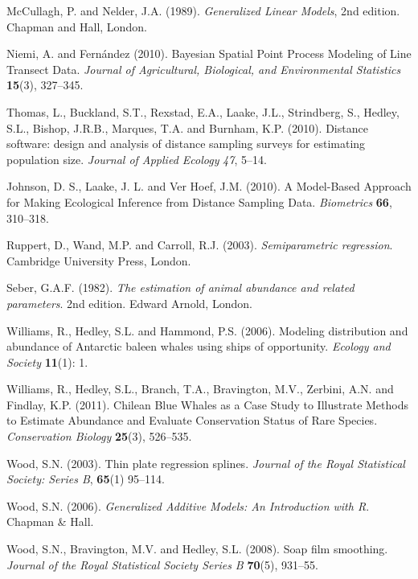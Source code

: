 \documentclass[useAMS,referee]{biom}
\begin{document}
\begin{thebibliography}{}
\bibitem{} McCullagh, P. and Nelder, J.A. (1989). \textit{Generalized Linear Models}, 2nd edition. Chapman and Hall, London.

\bibitem{} Niemi, A. and Fern\'andez (2010). Bayesian Spatial Point Process Modeling of Line Transect Data. \textit{Journal of Agricultural, Biological, and Environmental Statistics} \textbf{15}(3), 327--345.

\bibitem{ } Thomas, L., Buckland, S.T., Rexstad, E.A., Laake, J.L., Strindberg, S., Hedley, S.L., Bishop, J.R.B., Marques, T.A. and Burnham, K.P. (2010). Distance software: design and analysis of distance sampling surveys for estimating population size. \textit{Journal of Applied Ecology} \textit{47}, 5--14.

\bibitem{} Johnson, D. S., Laake, J. L. and Ver Hoef, J.M. (2010). A Model-Based Approach for Making Ecological Inference from Distance Sampling Data. \textit{Biometrics} \textbf{66}, 310--318.

\bibitem{} Ruppert, D., Wand, M.P. and Carroll, R.J. (2003). \textit{Semiparametric regression}. Cambridge
University Press, London.

\bibitem{} Seber, G.A.F. (1982). \textit{The estimation of animal abundance and related parameters}. 2nd edition. Edward Arnold, London.

\bibitem{} Williams, R., Hedley, S.L. and Hammond, P.S. (2006). Modeling distribution and abundance of {A}ntarctic baleen whales using ships of opportunity. \textit{Ecology and Society} \textbf{11}(1): 1.

\bibitem{} Williams, R., Hedley, S.L., Branch, T.A., Bravington, M.V., Zerbini, A.N. and Findlay, K.P. (2011). Chilean Blue Whales as a Case Study to Illustrate Methods to Estimate Abundance and Evaluate Conservation Status of Rare Species. \textit{Conservation Biology} \textbf{25}(3), 526--535.

\bibitem{} Wood, S.N. (2003). Thin plate regression splines. \textit{Journal of the Royal Statistical Society: Series B}, \textbf{65}(1) 95--114.

\bibitem{} Wood, S.N. (2006). \textit{Generalized Additive Models: An Introduction with R}. Chapman \& Hall.


\bibitem{} Wood, S.N., Bravington, M.V. and Hedley, S.L. (2008). Soap film smoothing. \textit{Journal of the Royal Statistical Society Series B} \textbf{70}(5), 931--55.


\end{thebibliography}
\end{document}

